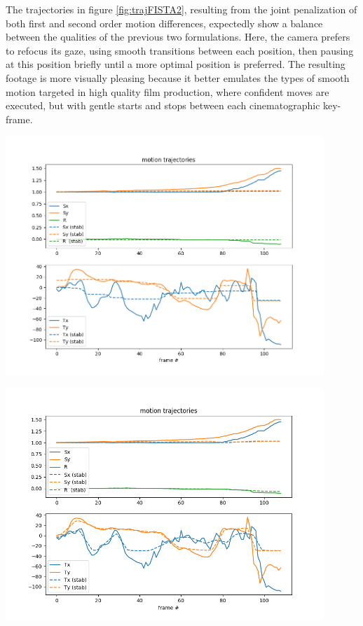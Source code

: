 \documentclass{article} %
\begin{document}
The trajectories in figure \ref{fig:trajFISTA2}, resulting from the joint penalization of both first and second order motion differences, expectedly show a balance between the qualities of the previous two formulations. Here, the camera prefers to refocus its gaze, using smooth transitions between each position, then pausing at this position briefly until a more optimal position is preferred. The resulting footage is more visually pleasing because it better emulates the types of smooth motion targeted in high quality film production, where confident moves are executed, but with gentle starts and stops between each cinematographic key-frame.
\begin{center}
  \includegraphics[width=0.9\textwidth]{trajetory_FISTA3.png}
  \label{fig:trajFISTA3}
\end{center}
\begin{center}
  \includegraphics[width=0.9\textwidth]{trajetory_FISTA1.png}
  \label{fig:trajFISTA1}
\end{center}
\end{document}
